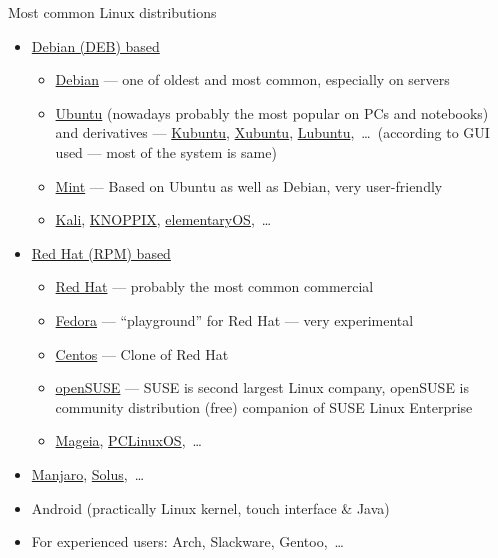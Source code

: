 \documentclass[compress, ucs, xelatex, 11pt, xcolor=svgnames, aspectratio=169,
	hyperref={
		bookmarks=true,
		unicode=true,
		colorlinks=true,
		pdftitle={Linux, command line and MetaCentrum},
		plainpages=false,
		pdfauthor={Vojtech Zeisek},
		pdfsubject={Course about use of Linux command line, writing shell scripts and using MetaCentrum of CESNET},
		pdfcreator={XeLaTeX},
		pdfkeywords={Linux, GNU, BASH, shell, command line, MetaCentrum},
		linkcolor=DarkRed, %
		anchorcolor=DarkBlue, %
		citecolor=Indigo, %
		filecolor=NavyBlue, %
		menucolor=DarkMagenta, %
		urlcolor=DarkBlue, %
		pdftex},
	url={hyphens, lowtilde} %
	]{beamer}
\begin{document}
\begin{frame}{Most common Linux distributions}
	\begin{itemize}
		\item \href{https://distrowatch.com/search.php?package=DEB}{Debian (DEB) based}
		\begin{itemize}
			\item \href{https://www.debian.org/}{Debian} --- one of oldest and most common, especially on servers
			\item \href{https://ubuntu.com/}{Ubuntu} (nowadays probably the most popular on PCs and notebooks) and derivatives --- \href{https://kubuntu.org/}{Kubuntu}, \href{https://xubuntu.org/}{Xubuntu}, \href{https://lubuntu.net/}{Lubuntu},~\ldots~(according to GUI used --- most of the system is same)
			\item \href{https://linuxmint.com/}{Mint} --- Based on Ubuntu as well as Debian, very user-friendly
			\item \href{https://www.kali.org/}{Kali}, \href{https://knopper.net/knoppix/index-en.html}{KNOPPIX}, \href{https://elementary.io/}{elementaryOS},~\ldots
		\end{itemize}
		\item \href{https://distrowatch.com/search.php?package=RPM}{Red Hat (RPM) based}
		\begin{itemize}
			\item \href{https://www.redhat.com/}{Red Hat} --- probably the most common commercial
			\item \href{https://getfedora.org/}{Fedora} --- \enquote{playground} for Red Hat --- very experimental
			\item \href{https://www.centos.org/}{Centos} --- Clone of Red Hat
			\item \href{https://www.opensuse.org/}{openSUSE} --- SUSE is second largest Linux company, openSUSE is community distribution (free) companion of SUSE Linux Enterprise
			\item \href{https://www.mageia.org/}{Mageia}, \href{https://www.pclinuxos.com/}{PCLinuxOS},~\ldots
		\end{itemize}
		\item \href{https://manjaro.org/}{Manjaro}, \href{https://getsol.us/}{Solus},~\ldots
		\item Android (practically Linux kernel, touch interface \& Java)
		\item For experienced users: Arch, Slackware, Gentoo,~\ldots
	\end{itemize}
\end{frame}
\end{document}
